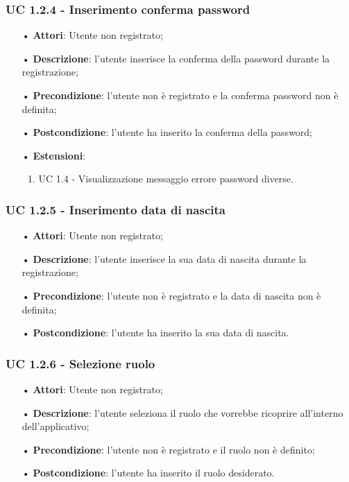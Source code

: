 \subsubsection{UC 1.2.4 - Inserimento conferma password}
\begin{itemize}
	\item[•]\textbf{Attori}: Utente non registrato;
	\item[•]\textbf{Descrizione}: l'utente inserisce la conferma della password durante la registrazione;
	\item[•]\textbf{Precondizione}: l'utente non è registrato e la conferma password non è definita;
	\item[•]\textbf{Postcondizione}: l'utente ha inserito la conferma della password;
	\item[•] \textbf{Estensioni}:
		\begin{enumerate}
		\item UC 1.4 - Visualizzazione messaggio errore password diverse.
	\end{enumerate}
\end{itemize}

\subsubsection{UC 1.2.5 - Inserimento data di nascita}
\begin{itemize}
	\item[•]\textbf{Attori}: Utente non registrato;
	\item[•]\textbf{Descrizione}: l'utente inserisce la sua data di nascita durante la registrazione;
	\item[•]\textbf{Precondizione}: l'utente non è registrato e la data di nascita non è definita;
	\item[•]\textbf{Postcondizione}: l'utente ha inserito la sua data di nascita.
\end{itemize}

\subsubsection{UC 1.2.6 - Selezione ruolo}
\begin{itemize}
	\item[•]\textbf{Attori}: Utente non registrato;
	\item[•]\textbf{Descrizione}: l'utente seleziona il ruolo che vorrebbe ricoprire all'interno dell'applicativo;
	\item[•]\textbf{Precondizione}: l'utente non è registrato e il ruolo non è definito;
	\item[•]\textbf{Postcondizione}: l'utente ha inserito il ruolo desiderato.
\end{itemize}

